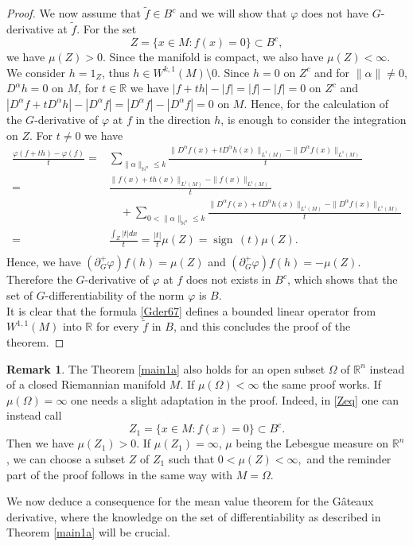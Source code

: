 \documentclass[a4paper,12pt,reqno]{amsart}%
\theoremstyle{definition}
\newtheorem{remark}[theorem]{Remark}
\numberwithin{equation}{section}
\numberwithin{theorem}{section}
\newcommand{\ar}{\mathbb{R}}
\newcommand{\arn}{{\mathbb{R}}^n}
\DeclareMathOperator*{\sign}{sign\,}
\begin{document}
\begin{proof}
We now assume that $\tilde{f}\in B^{c}$ and we will show that $\varphi$ does not have $G$-derivative at  $\tilde{f}$. For the set 
\begin{equation}\label{Zeq} Z=\{x\in M:f(x)=0\}\subset B^{c}, 
 \end{equation}
we have
$\mu(Z)>0.$ Since the manifold is compact, we also have $\mu(Z)<\infty$.  We consider $h=1_{Z}$, thus $h\in W^{k,1}(M)\setminus 0$. Since $h=0$ on $Z^c$ and for $\|\alpha\|\neq 0$, $D^{\alpha}h=0$ on $M$, for $t\in\ar$ we have  $|f+th|-|f|=|f|-|f|=0$ on  $Z^c$ and $|D^{\alpha}f+tD^{\alpha}h|-|D^{\alpha}f|=|D^{\alpha}f|-|D^{\alpha}f|=0$ on $M$. Hence, for the calculation of the $G$-derivative of $\varphi$ at $f$ in the direction $h$, is enough to consider the integration on $Z$.
 For $t\neq 0$ we have 
{\setlength\arraycolsep{0pt}
		\begin{align*}
		\frac{\varphi(f+th)-\varphi(f)}{t}=& \sum\limits_{\|\alpha\|_{\mathbb{N}^{n}}\leq k}\frac{  \|D^{\alpha}f(x)+tD^{\alpha}h(x)\|_{L^{1}(M)}-  \|D^{\alpha}f(x)\|_{L^{1}(M)}}{t} \\ 
		 =&\frac{  \|f(x)+th(x)\|_{L^{1}(M)}-  \|f(x)\|_{L^{1}(M)}}{t}\nonumber\\&\quad +\sum\limits_{0<\|\alpha\|_{\mathbb{N}^{n}}\leq k}\frac{  \|D^{\alpha}f(x)+tD^{\alpha}h(x)\|_{L^{1}(M)}-  \|D^{\alpha}f(x)\|_{L^{1}(M)}}{t}\nonumber\\ 
		 =&\frac{ \int_{Z}|t|dx}{t}=\frac{|t|}{t}\mu(Z)=\sign(t)\mu(Z).\nonumber\\
		\end{align*}}
Hence,  we have $(\partial_G^+\varphi)f(h)=\mu(Z)$ and $(\partial_G^+\varphi)f(h)=-\mu(Z)$. Therefore  the $G$-derivative of $\varphi$ at $f$ does not exists in $B^c$, which shows that the set of $G$-differentiability of the norm $\varphi$ is  $B$.\\
 
It is clear that the formula \eqref{Gder67} defines a bounded linear operator from  $ W^{1,1}(M)$ into $\ar$ for every $\tilde{f}$ in $B$, and this concludes the proof of the theorem.
\end{proof}

\begin{remark}  The   Theorem \ref{main1a} also holds for an open subset $\Omega$ of $\arn$ instead of a closed Riemannian manifold $M$. If $\mu(\Omega)<\infty$ the same proof works. If $\mu(\Omega)=\infty$ one needs a slight adaptation in the proof. Indeed, in \eqref{Zeq} one can instead call 
\[Z_1=\{x\in M:f(x)=0\}\subset B^{c}.\] 
 Then  we have
$\mu(Z_1)>0.$ If $\mu(Z_1)=\infty$, $\mu$ being the Lebesgue measure on $\arn$, we can choose a subset $Z$ of $Z_1$ such that $0<\mu(Z)<\infty,$ and the reminder part of the proof follows in the same way with $M=\Omega.$
\end{remark}	
We now deduce a consequence for the mean value theorem for the G\^ateaux derivative, where the knowledge on the set of differentiability as described in Theorem \ref{main1a} will be crucial. 
 
\end{document}

